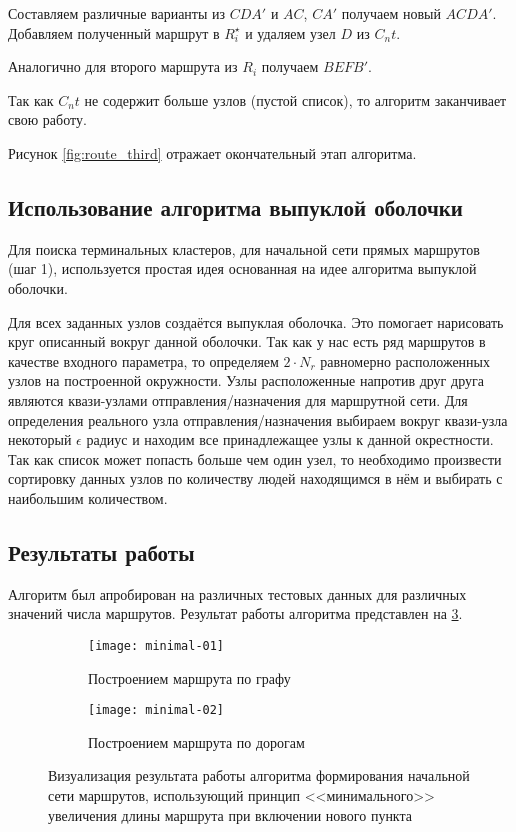 Составляем различные варианты из \( CDA' \) и \( AC \), \( CA' \) получаем новый \( ACDA' \). Добавляем 
полученный маршрут в \( R^{\star}_i \) и удаляем узел \( D \) из \( C_nt \).

Аналогично для второго маршрута из \( R_i \) получаем \( BEFB' \).

Так как \( C_nt \) не содержит больше узлов (пустой список), то алгоритм заканчивает свою работу.

Рисунок \ref{fig:route_third} отражает окончательный этап алгоритма.

\subsection{Использование алгоритма выпуклой оболочки}
Для поиска терминальных кластеров, для начальной сети прямых маршрутов (шаг 1), используется простая идея 
основанная на идее алгоритма выпуклой оболочки.

Для всех заданных узлов создаётся выпуклая оболочка. Это помогает нарисовать круг описанный вокруг данной
оболочки. Так как у нас есть ряд маршрутов в качестве входного параметра, то определяем \( 2\cdot N_r \) 
равномерно расположенных узлов на построенной окружности. Узлы расположенные напротив друг друга являются 
квази-узлами отправления/назначения для маршрутной сети. Для определения реального узла отправления/назначения 
выбираем вокруг квази-узла некоторый \( \epsilon \) радиус и находим все принадлежащее узлы к данной окрестности.
Так как список может попасть больше чем один узел, то необходимо произвести сортировку данных узлов по 
количеству людей находящимся в нём и выбирать с наибольшим количеством.

\subsection{Результаты работы}
Алгоритм был апробирован на различных тестовых данных для различных значений числа маршрутов. 
Результат работы алгоритма представлен на \ref{img:min-length-01}.
\begin{figure}[h!]
    \centering
    \begin{subfigure}{0.47\textwidth}
        \texttt{[image: minimal-01]}
        \caption{Построением маршрута по графу}
        \label{fig:graph}
    \end{subfigure}
    \begin{subfigure}{0.47\textwidth}
        \texttt{[image: minimal-02]}
        \caption{Построением маршрута по дорогам}
        \label{fig:osrm}
    \end{subfigure}
    \caption{Визуализация результата работы алгоритма формирования начальной сети маршрутов, 
        использующий принцип <<минимального>> увеличения длины маршрута при включении нового пункта%
    }
   \label{img:min-length-01}
\end{figure}

